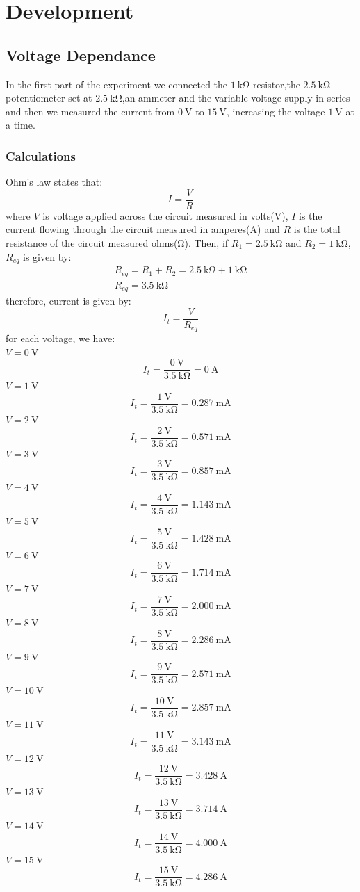 \documentclass[a4paper]{article}
\begin{document}
\section{Development}
\subsection{Voltage Dependance}
In the first part of the experiment we connected the $\SI{1}{\kilo\ohm}$ resistor,the
$\SI{2.5}{\kilo\ohm}$ potentiometer set at $\SI{2.5}{\kilo\ohm}$,an ammeter and the variable voltage supply in series
and then we measured the current from $\SI{0}{\volt}$ to $\SI{15}{\volt}$, increasing the
voltage $\SI{1}{\volt}$ at a time.
\subsubsection{Calculations}
Ohm's law states that:
\[I=\frac{V}{R}\]
where $V$ is voltage applied across the circuit measured in volts($\si{\volt}$), $I$ is the current flowing
through the circuit measured in amperes($\si{\ampere}$) and $R$ is the total resistance of the
circuit measured ohms($\si{\ohm}$).
Then, if $R_1=\SI{2.5}{\kilo\ohm}$ and $R_2=\SI{1}{\kilo\ohm}$, $R_{eq}$ is given by:
\begin{gather*}
    R_{eq}=R_1+R_2=\SI{2.5}{\kilo\ohm}+\SI{1}{\kilo\ohm}\\
    R_{eq}=\SI{3.5}{\kilo\ohm}
\end{gather*}
therefore, current is given by:
\[I_t=\frac{V}{R_{eq}}\]
for each voltage, we have:\\
$V=\SI{0}{\volt}$
\[I_t=\frac{\SI{0}{\volt}}{\SI{3.5}{\kilo\ohm}}=\SI{0}{\ampere}\]
$V=\SI{1}{\volt}$
\[I_t=\frac{\SI{1}{\volt}}{\SI{3.5}{\kilo\ohm}}=\SI{0.287}{\milli\ampere}\]
$V=\SI{2}{\volt}$
\[I_t=\frac{\SI{2}{\volt}}{\SI{3.5}{\kilo\ohm}}=\SI{0.571}{\milli\ampere}\]
$V=\SI{3}{\volt}$
\[I_t=\frac{\SI{3}{\volt}}{\SI{3.5}{\kilo\ohm}}=\SI{0.857}{\milli\ampere}\]
$V=\SI{4}{\volt}$
\[I_t=\frac{\SI{4}{\volt}}{\SI{3.5}{\kilo\ohm}}=\SI{1.143}{\milli\ampere}\]
$V=\SI{5}{\volt}$
\[I_t=\frac{\SI{5}{\volt}}{\SI{3.5}{\kilo\ohm}}=\SI{1.428}{\milli\ampere}\]
$V=\SI{6}{\volt}$
\[I_t=\frac{\SI{6}{\volt}}{\SI{3.5}{\kilo\ohm}}=\SI{1.714}{\milli\ampere}\]
$V=\SI{7}{\volt}$
\[I_t=\frac{\SI{7}{\volt}}{\SI{3.5}{\kilo\ohm}}=\SI{2.000}{\milli\ampere}\]
$V=\SI{8}{\volt}$
\[I_t=\frac{\SI{8}{\volt}}{\SI{3.5}{\kilo\ohm}}=\SI{2.286}{\milli\ampere}\]
$V=\SI{9}{\volt}$
\[I_t=\frac{\SI{9}{\volt}}{\SI{3.5}{\kilo\ohm}}=\SI{2.571}{\milli\ampere}\]
$V=\SI{10}{\volt}$
\[I_t=\frac{\SI{10}{\volt}}{\SI{3.5}{\kilo\ohm}}=\SI{2.857}{\milli\ampere}\]
$V=\SI{11}{\volt}$
\[I_t=\frac{\SI{11}{\volt}}{\SI{3.5}{\kilo\ohm}}=\SI{3.143}{\milli\ampere}\]
$V=\SI{12}{\volt}$
\[I_t=\frac{\SI{12}{\volt}}{\SI{3.5}{\kilo\ohm}}=\SI{3.428}{\ampere}\]
$V=\SI{13}{\volt}$
\[I_t=\frac{\SI{13}{\volt}}{\SI{3.5}{\kilo\ohm}}=\SI{3.714}{\ampere}\]
$V=\SI{14}{\volt}$
\[I_t=\frac{\SI{14}{\volt}}{\SI{3.5}{\kilo\ohm}}=\SI{4.000}{\ampere}\]
$V=\SI{15}{\volt}$
\[I_t=\frac{\SI{15}{\volt}}{\SI{3.5}{\kilo\ohm}}=\SI{4.286}{\ampere}\]
\end{document}
